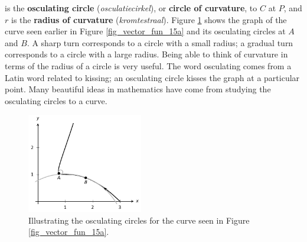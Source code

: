 is the \textbf{osculating circle} (\textit{osculatiecirkel}), or \textbf{circle of curvature}, to $C$ at $P$, and $r$ is the \textbf{radius of curvature} (\textit{kromtestraal}). %
Figure \ref{fig_vector_fun_16} shows the graph of the curve seen earlier in Figure \ref{fig_vector_fun_15a} and its osculating circles at $A$ and $B$. A sharp turn corresponds to a circle with a small radius; a gradual turn corresponds to a circle with a large radius. Being able to think of curvature in terms of the radius of a circle is very useful. The word osculating comes from a Latin word related to kissing; an osculating circle kisses the graph at a particular point. Many beautiful ideas in mathematics have come from studying the osculating circles to a curve. 


\begin{figure}[h]
	\begin{center}
			\includegraphics[width=0.45\textwidth]{fig_vector_fun_16}
	\caption{Illustrating the osculating circles for the curve seen in Figure \ref{fig_vector_fun_15a}.}
	\label{fig_vector_fun_16}
	\end{center}
\end{figure}

